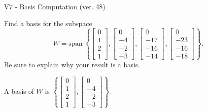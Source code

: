 \begin{exercise}
  \begin{exerciseTitle}V7 - Basis Computation (ver. 48)\end{exerciseTitle}
  \begin{exerciseStatement}
    Find a basis for the subspace 
\[W=\mathrm{span}\ \left\{\left[\begin{array}{r}
0 \\
1 \\
2 \\
1
\end{array}\right] , \left[\begin{array}{r}
0 \\
-4 \\
-2 \\
-3
\end{array}\right] , \left[\begin{array}{r}
0 \\
-17 \\
-16 \\
-14
\end{array}\right] , \left[\begin{array}{r}
0 \\
-23 \\
-16 \\
-18
\end{array}\right]\right\}.\]
 Be sure to explain why your result is a basis.


  \end{exerciseStatement}
  \begin{exerciseAnswer}
   A basis of \(W\) is  \(\left\{\left[\begin{array}{r}
0 \\
1 \\
2 \\
1
\end{array}\right] , \left[\begin{array}{r}
0 \\
-4 \\
-2 \\
-3
\end{array}\right]\right\}\).
  


  \end{exerciseAnswer}
\end{exercise}
